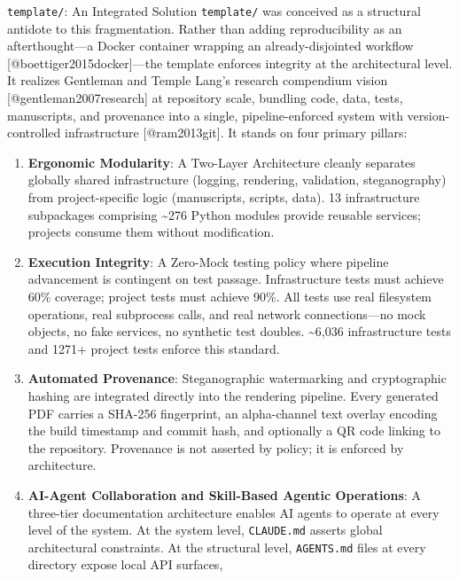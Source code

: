 \documentclass[
  ignorenonframetext,
]{beamer}
\begin{document}
\begin{frame}[fragile]{\texttt{template/}: An Integrated Solution}
\protect{}\label{template-an-integrated-solution}
\texttt{template/} was conceived as a structural antidote to this
fragmentation. Rather than adding reproducibility as an afterthought---a
Docker container wrapping an already-disjointed workflow
{[}@boettiger2015docker{]}---the template enforces integrity at the
architectural level. It realizes Gentleman and Temple Lang's research
compendium vision {[}@gentleman2007research{]} at repository scale,
bundling code, data, tests, manuscripts, and provenance into a single,
pipeline-enforced system with version-controlled infrastructure
{[}@ram2013git{]}. It stands on four primary pillars:

\begin{enumerate}
\item
  \textbf{Ergonomic Modularity}: A Two-Layer Architecture cleanly
  separates globally shared infrastructure (logging, rendering,
  validation, steganography) from project-specific logic (manuscripts,
  scripts, data). 13 infrastructure subpackages comprising
  \textasciitilde276 Python modules provide reusable services; projects
  consume them without modification.
\item
  \textbf{Execution Integrity}: A Zero-Mock testing policy where
  pipeline advancement is contingent on test passage. Infrastructure
  tests must achieve 60\% coverage; project tests must achieve 90\%. All
  tests use real filesystem operations, real subprocess calls, and real
  network connections---no mock objects, no fake services, no synthetic
  test doubles. \textasciitilde6,036 infrastructure tests and 1271+
  project tests enforce this standard.
\item
  \textbf{Automated Provenance}: Steganographic watermarking and
  cryptographic hashing are integrated directly into the rendering
  pipeline. Every generated PDF carries a SHA-256 fingerprint, an
  alpha-channel text overlay encoding the build timestamp and commit
  hash, and optionally a QR code linking to the repository. Provenance
  is not asserted by policy; it is enforced by architecture.
\item
  \textbf{AI-Agent Collaboration and Skill-Based Agentic Operations}: A
  three-tier documentation architecture enables AI agents to operate at
  every level of the system. At the system level, \texttt{CLAUDE.md}
  asserts global architectural constraints. At the structural level,
  \texttt{AGENTS.md} files at every directory expose local API surfaces,

\end{enumerate}
\end{frame}
\end{document}
